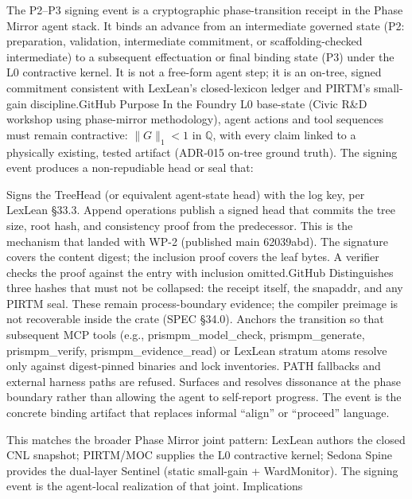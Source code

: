 \documentclass[
]{article}
\author{}
\date{}
\begin{document}
The P2--P3 signing event is a cryptographic phase-transition receipt in
the Phase Mirror agent stack. It binds an advance from an intermediate
governed state (P2: preparation, validation, intermediate commitment, or
scaffolding-checked intermediate) to a subsequent effectuation or final
binding state (P3) under the L0 contractive kernel. It is not a
free-form agent step; it is an on-tree, signed commitment consistent
with LexLean's closed-lexicon ledger and PIRTM's small-gain
discipline.⁠GitHub Purpose In the Foundry L0 base-state (Civic R\&D
workshop using phase-mirror methodology), agent actions and tool
sequences must remain contractive: \(\|G\|_1 < 1\) in \(\mathbb{Q}\),
with every claim linked to a physically existing, tested artifact
(ADR-015 on-tree ground truth). The signing event produces a
non-repudiable head or seal that:

Signs the TreeHead (or equivalent agent-state head) with the log key,
per LexLean §33.3. Append operations publish a signed head that commits
the tree size, root hash, and consistency proof from the predecessor.
This is the mechanism that landed with WP-2 (published main 62039abd).
The signature covers the content digest; the inclusion proof covers the
leaf bytes. A verifier checks the proof against the entry with inclusion
omitted.⁠GitHub Distinguishes three hashes that must not be collapsed:
the receipt itself, the snapaddr, and any PIRTM seal. These remain
process-boundary evidence; the compiler preimage is not recoverable
inside the crate (SPEC §34.0). Anchors the transition so that subsequent
MCP tools (e.g., prismpm\_model\_check, prismpm\_generate,
prismpm\_verify, prismpm\_evidence\_read) or LexLean stratum atoms
resolve only against digest-pinned binaries and lock inventories. PATH
fallbacks and external harness paths are refused. Surfaces and resolves
dissonance at the phase boundary rather than allowing the agent to
self-report progress. The event is the concrete binding artifact that
replaces informal ``align'' or ``proceed'' language.

This matches the broader Phase Mirror joint pattern: LexLean authors the
closed CNL snapshot; PIRTM/MOC supplies the L0 contractive kernel;
Sedona Spine provides the dual-layer Sentinel (static small-gain +
WardMonitor). The signing event is the agent-local realization of that
joint. Implications
\end{document}
